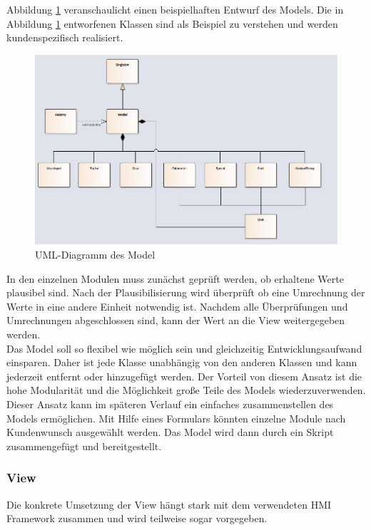 Abbildung \ref{fig:model_diagram} veranschaulicht einen beispielhaften Entwurf des Models. Die in Abbildung \ref{fig:model_diagram} entworfenen Klassen sind als Beispiel zu verstehen und werden kundenspezifisch realisiert.\\

\begin{figure}[htb]
	\centering
	\includegraphics[width=\textwidth]{img/3_entwicklung_neues_kontept/model_diagram}
	\caption{UML-Diagramm des Model}
	\label{fig:model_diagram}
\end{figure}

In den einzelnen Modulen muss zunächst geprüft werden, ob erhaltene Werte plausibel sind. Nach der Plausibilisierung wird überprüft ob eine Umrechnung der Werte in eine andere Einheit notwendig ist. Nachdem alle Überprüfungen und Umrechnungen abgeschlossen sind, kann der Wert an die View weitergegeben werden.\\

Das Model soll so flexibel wie möglich sein und gleichzeitig Entwicklungsaufwand einsparen. Daher ist jede Klasse unabhängig von den anderen Klassen und kann jederzeit entfernt oder hinzugefügt werden. Der Vorteil von diesem Ansatz ist die hohe Modularität und die Möglichkeit große Teile des Models wiederzuverwenden. Dieser Ansatz kann im späteren Verlauf ein einfaches zusammenstellen des Models ermöglichen. Mit Hilfe eines Formulars könnten einzelne Module nach Kundenwunsch ausgewählt werden. Das Model wird dann durch ein Skript zusammengefügt und bereitgestellt.\\ 

\subsubsection{View}
Die konkrete Umsetzung der View hängt stark mit dem verwendeten HMI Framework zusammen und wird teilweise sogar vorgegeben.\\

